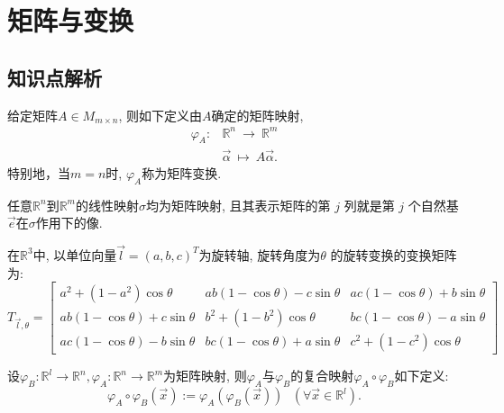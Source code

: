 \chapter{矩阵与变换}

\section{知识点解析}
\begin{Def}
给定矩阵$A\in M_{m\times n}$, 则如下定义由$A$确定的矩阵映射,
\begin{displaymath}\begin{aligned}
\varphi_A: & \mathbb{R}^n\ \rightarrow\ \mathbb{R}^m\\
& \vec{\alpha}\ \mapsto\ A\vec{\alpha}.\end{aligned}\end{displaymath}
特别地，当$m=n$时, $\varphi_A$称为矩阵变换.
\end{Def}

\begin{thm}
任意$\mathbb{R}^n$到$ \mathbb{R}^m$的线性映射$\sigma$均为矩阵映射, 且其表示矩阵的第 $j$ 列就是第 $j$ 个自然基$\vec{e}$在$\sigma$作用下的像.

\end{thm}

\begin{thm}
在$\mathbb{R}^3$中, 以单位向量$\vec{l} =(a,b,c)^T$为旋转轴, 旋转角度为$\theta$ 的旋转变换的变换矩阵为:
\begin{displaymath}
T_{\vec{l},\theta}=\begin{bmatrix} a^2+(1-a^2)\cos\theta & ab(1-\cos\theta)-c\sin\theta & ac(1-\cos\theta)+b\sin\theta\\
ab(1-\cos\theta)+c\sin\theta & b^2+(1-b^2)\cos\theta & bc(1-\cos\theta)-a\sin\theta  \\
ac(1-\cos\theta)-b\sin\theta& bc(1-\cos\theta)+a\sin\theta & c^2+(1-c^2)\cos\theta\end{bmatrix}\end{displaymath}
\end{thm}


\begin{Def}
设$\varphi_B:\mathbb{R}^l \rightarrow \mathbb{R}^n, \varphi_A:\mathbb{R}^n \rightarrow \mathbb{R}^m$为矩阵映射, 则$\varphi_A$与$\varphi_B$的复合映射$\varphi_A\circ \varphi_B$如下定义:
\begin{displaymath}
 \varphi_A\circ \varphi_B(\vec{x}):=\varphi_A( \varphi_B(\vec{x}))\ \ \ (\forall \vec{x}\in \mathbb{R}^l).\end{displaymath}
\end{Def}

